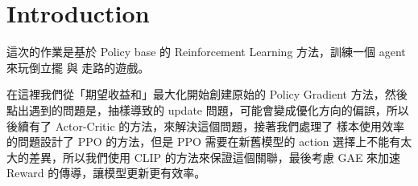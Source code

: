 \section{Introduction}

這次的作業是基於 Policy base 的 Reinforcement Learning 方法，訓練一個 agent 來玩倒立擺 與 走路的遊戲。

在這裡我們從「期望收益和」最大化開始創建原始的 Policy Gradient 方法，然後點出遇到的問題是，抽樣導致的 update 問題，可能會變成優化方向的偏誤，所以後續有了 Actor-Critic 的方法，來解決這個問題，接著我們處理了 樣本使用效率的問題設計了 PPO 的方法，但是 PPO 需要在新舊模型的 action 選擇上不能有太大的差異，所以我們使用 CLIP 的方法來保證這個關聯，最後考慮 GAE 來加速 Reward 的傳導，讓模型更新更有效率。